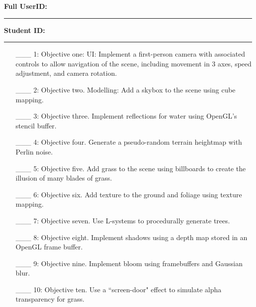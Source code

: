 \documentclass {article}
\begin{document}

{\hfill{\bf Full UserID:\rule{2in}{.1mm}}\hfill{\bf Student ID:\rule{2in}{.1mm}}\hfill}

\begin{enumerate}
     \item[\_\_\_ 1:]  Objective one: UI: Implement a first-person camera with associated controls to allow navigation of the scene, including movement in 3 axes, speed adjustment, and camera rotation.

     \item[\_\_\_ 2:]  Objective two. Modelling: Add a skybox to the scene using cube mapping.

     \item[\_\_\_ 3:]  Objective three. Implement reflections for water using OpenGL's stencil buffer.

     \item[\_\_\_ 4:]  Objective four. Generate a pseudo-random terrain heightmap with Perlin noise.

     \item[\_\_\_ 5:]  Objective five. Add grass to the scene using billboards to create the illusion of many blades of grass.

     \item[\_\_\_ 6:]  Objective six. Add texture to the ground and foliage using texture mapping.

     \item[\_\_\_ 7:]  Objective seven. Use L-systems to procedurally generate trees.

     \item[\_\_\_ 8:]  Objective eight. Implement shadows using a depth map stored in an OpenGL frame buffer.

     \item[\_\_\_ 9:]  Objective nine. Implement bloom using framebuffers and Gaussian blur.

     \item[\_\_\_ 10:]  Objective ten. Use a ``screen-door" effect to simulate alpha transparency for grass.
\end{enumerate}
\end{document}
